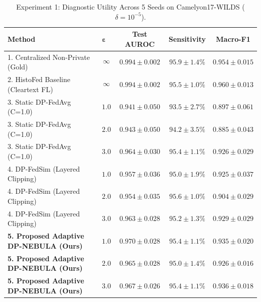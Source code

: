 \begin{table}[!t]
\centering
\caption{Experiment 1: Diagnostic Utility Across 5 Seeds on Camelyon17-WILDS ($\delta=10^{-5}$).}
\label{tab:exp1}
\begin{tabular}{llccc}
\toprule
\textbf{Method} & $\boldsymbol{\varepsilon}$ & \textbf{Test AUROC} & \textbf{Sensitivity} & \textbf{Macro-F1} \\
\midrule
1. Centralized Non-Private (Gold) & $$\infty$$ & $0.994 \pm 0.002$ & $95.9 \pm 1.4\%$ & $0.954 \pm 0.015$ \\
2. HistoFed Baseline (Cleartext FL) & $$\infty$$ & $0.994 \pm 0.002$ & $95.5 \pm 1.0\%$ & $0.960 \pm 0.013$ \\
3. Static DP-FedAvg (C=1.0) & $1.0$ & $0.941 \pm 0.050$ & $93.5 \pm 2.7\%$ & $0.897 \pm 0.061$ \\
3. Static DP-FedAvg (C=1.0) & $2.0$ & $0.943 \pm 0.050$ & $94.2 \pm 3.5\%$ & $0.885 \pm 0.043$ \\
3. Static DP-FedAvg (C=1.0) & $3.0$ & $0.964 \pm 0.030$ & $95.4 \pm 1.1\%$ & $0.926 \pm 0.029$ \\
4. DP-FedSim (Layered Clipping) & $1.0$ & $0.957 \pm 0.036$ & $95.0 \pm 1.9\%$ & $0.925 \pm 0.037$ \\
4. DP-FedSim (Layered Clipping) & $2.0$ & $0.954 \pm 0.035$ & $95.6 \pm 1.0\%$ & $0.904 \pm 0.029$ \\
4. DP-FedSim (Layered Clipping) & $3.0$ & $0.963 \pm 0.028$ & $95.2 \pm 1.3\%$ & $0.929 \pm 0.029$ \\
\textbf{5. Proposed Adaptive DP-NEBULA (Ours)} & $\mathbf{1.0}$ & $\mathbf{0.970 \pm 0.028}$ & $\mathbf{95.4 \pm 1.1\%}$ & $\mathbf{0.935 \pm 0.020}$ \\
\textbf{5. Proposed Adaptive DP-NEBULA (Ours)} & $\mathbf{2.0}$ & $\mathbf{0.965 \pm 0.028}$ & $\mathbf{95.0 \pm 1.4\%}$ & $\mathbf{0.926 \pm 0.016}$ \\
\textbf{5. Proposed Adaptive DP-NEBULA (Ours)} & $\mathbf{3.0}$ & $\mathbf{0.967 \pm 0.026}$ & $\mathbf{95.4 \pm 1.1\%}$ & $\mathbf{0.936 \pm 0.018}$ \\
\bottomrule
\end{tabular}
\end{table}